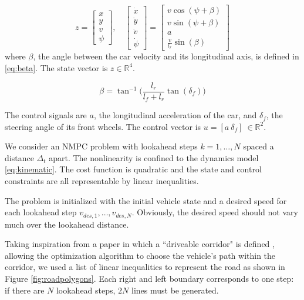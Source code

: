 \documentclass[conference]{IEEEtran}
\begin{document}
\begin{equation}
z = \begin{bmatrix}
x\\y\\v\\\psi
\end{bmatrix},\quad \begin{bmatrix}
\dot x\\\dot y\\\dot v\\\dot\psi
\end{bmatrix} = \begin{bmatrix}
v\cos(\psi + \beta)\\
v\sin(\psi + \beta)\\
a\\
\frac{v}{l_r}\sin(\beta)
\end{bmatrix}
\label{eq:kinematic}
\end{equation}
where $\beta$, the angle between the car velocity and its longitudinal axis, is defined in  \eqref{eq:beta}. The state vector is $z \in \mathbb{R}^4$.

\begin{equation}
\beta = \tan^{-1}\Big( \frac{l_r}{l_f + l_r}\tan(\delta_f) \Big)
\label{eq:beta}
\end{equation}

The control signals are $a$, the longitudinal acceleration of the car, and $\delta_f$, the steering angle of its front wheels. The control vector is $u = [a\ \delta_f]\ \in \mathbb{R}^2$.

We consider an NMPC problem with lookahead steps $k=1,\dots,N$ spaced a distance $\Delta_t$ apart. The nonlinearity is confined to the dynamics model \eqref{eq:kinematic}. The cost function is quadratic and the state and control constraints are all representable by linear inequalities.

The problem is initialized with the initial vehicle state and a desired speed for each lookahead step $v_{des,1},\dots,v_{des,N}$. Obviously, the desired speed should not vary much over the lookahead distance.

Taking inspiration from a paper in which a ``driveable corridor" is defined \cite{li6640152}, allowing the optimization algorithm to choose the vehicle's path within the corridor, we used a list of linear inequalities to represent the road as shown in Figure \ref{fig:roadpolygons}. Each right and left boundary corresponds to one step: if there are $N$ lookahead steps, $2N$ lines must be generated.
\end{document}
